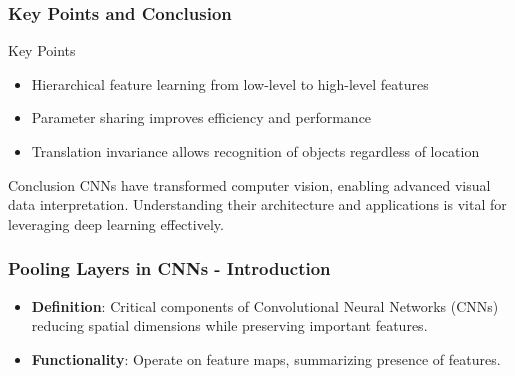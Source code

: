 \documentclass{beamer}
\begin{document}
\begin{frame}[fragile]
    \frametitle{Key Points and Conclusion}
    \begin{block}{Key Points}
        \begin{itemize}
            \item Hierarchical feature learning from low-level to high-level features
            \item Parameter sharing improves efficiency and performance
            \item Translation invariance allows recognition of objects regardless of location
        \end{itemize}
    \end{block}
    
    \begin{block}{Conclusion}
        CNNs have transformed computer vision, enabling advanced visual data interpretation. Understanding their architecture and applications is vital for leveraging deep learning effectively.
    \end{block}
\end{frame}

\begin{frame}[fragile]
    \frametitle{Pooling Layers in CNNs - Introduction}
    \begin{itemize}
        \item \textbf{Definition}: Critical components of Convolutional Neural Networks (CNNs) reducing spatial dimensions while preserving important features.
        \item \textbf{Functionality}: Operate on feature maps, summarizing presence of features.
    \end{itemize}
\end{frame}
\end{document}
